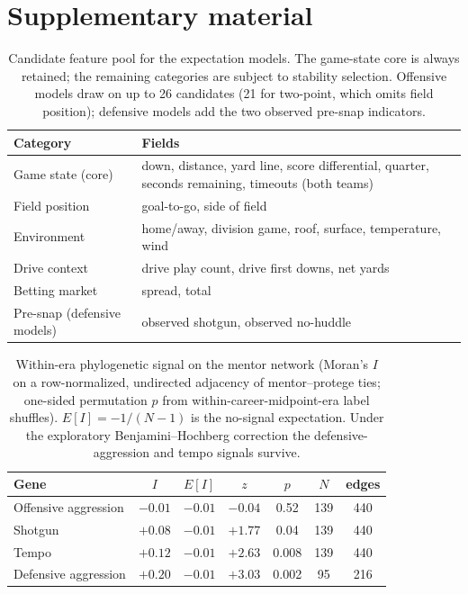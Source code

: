 \documentclass[
  journal=ehs,
  manuscript=article,
  year=2026,
  volume=8,
]{cup-journal}
\begin{document}
\section*{Supplementary material}

\begin{table}[h]
\centering
\caption{Candidate feature pool for the expectation models. The game-state core is
always retained; the remaining categories are subject to stability selection.
Offensive models draw on up to 26 candidates (21 for two-point, which omits field
position); defensive models add the two observed pre-snap indicators.}
\label{tab:features}
\begin{tabular}{@{}l p{}@{}}
\toprule
Category & Fields \\
\midrule
Game state (core) & down, distance, yard line, score differential, quarter, seconds remaining, timeouts (both teams) \\
Field position & goal-to-go, side of field \\
Environment & home/away, division game, roof, surface, temperature, wind \\
Drive context & drive play count, drive first downs, net yards \\
Betting market & spread, total \\
Pre-snap (defensive models) & observed shotgun, observed no-huddle \\
\bottomrule
\end{tabular}
\end{table}

\begin{table}[h]
\centering
\caption{Within-era phylogenetic signal on the mentor network (Moran's $I$ on a
row-normalized, undirected adjacency of mentor--protege ties; one-sided permutation
$p$ from within-career-midpoint-era label shuffles). $E[I]=-1/(N-1)$ is the
no-signal expectation. Under the exploratory Benjamini--Hochberg correction the
defensive-aggression and tempo signals survive.}
\label{tab:moran}
\begin{tabular}{lcccccc}
\toprule
Gene & $I$ & $E[I]$ & $z$ & $p$ & $N$ & edges \\
\midrule
Offensive aggression & $-0.01$ & $-0.01$ & $-0.04$ & 0.52 & 139 & 440 \\
Shotgun & $+0.08$ & $-0.01$ & $+1.77$ & 0.04 & 139 & 440 \\
Tempo & $+0.12$ & $-0.01$ & $+2.63$ & 0.008 & 139 & 440 \\
Defensive aggression & $+0.20$ & $-0.01$ & $+3.03$ & 0.002 & 95 & 216 \\
\bottomrule
\end{tabular}
\end{table}
\end{document}

